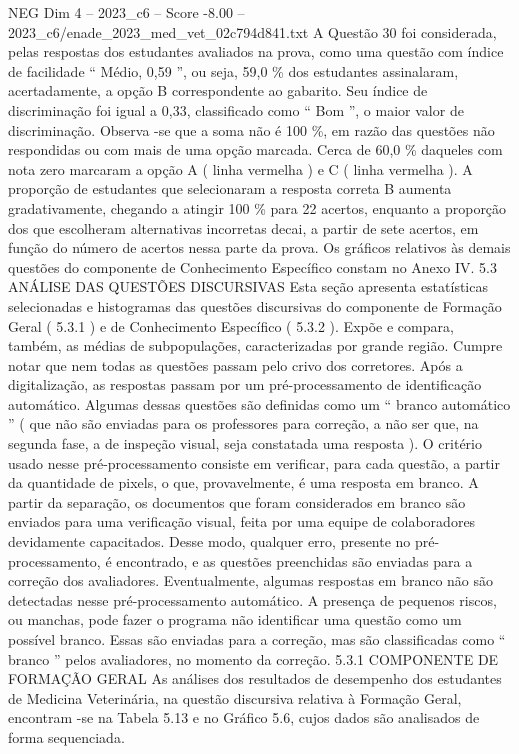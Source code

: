 \begin{textsample}{NEG Dim 4 – 2023\_c6 – Score -8.00 – 2023\_c6/enade\_2023\_med\_vet\_02c794d841.txt}
A Questão 30 foi considerada, pelas respostas dos estudantes avaliados na prova, como uma questão com índice de facilidade “ Médio, 0,59 ”, ou seja, 59,0 \% dos estudantes assinalaram, acertadamente, a opção B correspondente ao gabarito.
Seu índice de discriminação foi igual a 0,33, classificado como “ Bom ”, o maior valor de discriminação.
Observa -se que a soma não é 100 \%, em razão das questões não respondidas ou com mais de uma opção marcada.
Cerca de 60,0 \% daqueles com nota zero marcaram a opção A ( linha vermelha ) e C ( linha vermelha ).
A proporção de estudantes que selecionaram a resposta correta B aumenta gradativamente, chegando a atingir 100 \% para 22 acertos, enquanto a proporção dos que escolheram alternativas incorretas decai, a partir de sete acertos, em função do número de acertos nessa parte da prova.
Os gráficos relativos às demais questões do componente de Conhecimento Específico constam no Anexo IV. 5.3 ANÁLISE DAS QUESTÕES DISCURSIVAS Esta seção apresenta estatísticas selecionadas e histogramas das questões discursivas do componente de Formação Geral ( 5.3.1 ) e de Conhecimento Específico ( 5.3.2 ).
Expõe e compara, também, as médias de subpopulações, caracterizadas por grande região.
Cumpre notar que nem todas as questões passam pelo crivo dos corretores.
Após a digitalização, as respostas passam por um pré-processamento de identificação automático.
Algumas dessas questões são definidas como um “ branco automático ” ( que não são enviadas para os professores para correção, a não ser que, na segunda fase, a de inspeção visual, seja constatada uma resposta ).
O critério usado nesse pré-processamento consiste em verificar, para cada questão, a partir da quantidade de pixels, o que, provavelmente, é uma resposta em branco.
A partir da separação, os documentos que foram considerados em branco são enviados para uma verificação visual, feita por uma equipe de colaboradores devidamente capacitados.
Desse modo, qualquer erro, presente no pré-processamento, é encontrado, e as questões preenchidas são enviadas para a correção dos avaliadores.
Eventualmente, algumas respostas em branco não são detectadas nesse pré-processamento automático.
A presença de pequenos riscos, ou manchas, pode fazer o programa não identificar uma questão como um possível branco.
Essas são enviadas para a correção, mas são classificadas como “ branco ” pelos avaliadores, no momento da correção. 5.3.1 COMPONENTE DE FORMAÇÃO GERAL As análises dos resultados de desempenho dos estudantes de Medicina Veterinária, na questão discursiva relativa à Formação Geral, encontram -se na Tabela 5.13 e no Gráfico 5.6, cujos dados são analisados de forma sequenciada.

\end{textsample}
